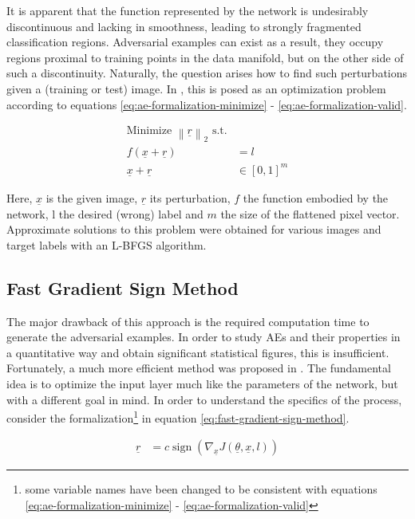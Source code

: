 \documentclass[11pt, a4paper]{article}
\newcommand\braces[1]{\left(#1\right)}
\newcommand\brackets[1]{\left[#1\right]}
\renewcommand{\vec}[1]{\underline{#1}}
\newcommand{\norm}[1]{\left\lVert#1\right\rVert}
\DeclareMathOperator{\sign}{sign}
\begin{document}
It is apparent that the function represented by the network is undesirably discontinuous and lacking in smoothness, leading to strongly fragmented classification regions. Adversarial examples can exist as a result, they occupy regions proximal to training points in the data manifold, but on the other side of such a discontinuity. Naturally, the question arises how to find such perturbations given a (training or test) image. In \cite{intriguing-properties-of-neural-networks}, this is posed as an optimization problem according to equations \eqref{eq:ae-formalization-minimize} - \eqref{eq:ae-formalization-valid}.

\begin{align}
	\text{Minimize $\norm{\vec{r}}_2$ s.t.} \label{eq:ae-formalization-minimize} \\
	f(\vec{x} + \vec{r}) &= l \label{eq:ae-formalization-label} \\
	\vec{x} + \vec{r} &\in \brackets{0, 1}^m \label{eq:ae-formalization-valid}
\end{align}

Here, $\vec{x}$ is the given image, $\vec{r}$ its perturbation, $f$ the function embodied by the network, l the desired (wrong) label and $m$ the size of the flattened pixel vector. Approximate solutions to this problem were obtained for various images and target labels with an L-BFGS algorithm.

\subsection{Fast Gradient Sign Method}
\label{sec:fast-gradient-sign-method}
The major drawback of this approach is the required computation time to generate the adversarial examples. In order to study AEs and their properties in a quantitative way and obtain significant statistical figures, this is insufficient. Fortunately, a much more efficient method was proposed in \cite{explaining-and-harnessing-adversarial-examples}. The fundamental idea is to optimize the input layer much like the parameters of the network, but with a different goal in mind. In order to understand the specifics of the process, consider the formalization\footnote{some variable names have been changed to be consistent with equations \eqref{eq:ae-formalization-minimize} - \eqref{eq:ae-formalization-valid}} in equation \eqref{eq:fast-gradient-sign-method}.

\begin{align}
	\vec{r} &= c \sign \braces{\nabla_{\vec{x}} J\braces{\vec{\theta}, \vec{x}, l}} \label{eq:fast-gradient-sign-method}
\end{align}
\end{document}
